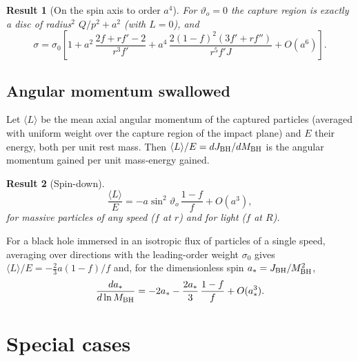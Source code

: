 \documentclass[11pt,a4paper]{article}
\newtheorem{result}{Result}
\theoremstyle{remark}
\numberwithin{equation}{section}
\begin{document}
\begin{result}[On the spin axis to order $a^4$]\label{res:pole}
For $\vartheta_o=0$ the capture region is exactly a disc of radius$^2$ $Q/p^2+a^2$ (with $L=0$), and
\begin{equation}
\sigma=\sigma_0\left[1+a^2\,\frac{2f+rf'-2}{r^3f'}+a^4\,\frac{2(1-f)^2(3f'+rf'')}{r^5f'J}+O(a^6)\right].
\label{eq:sigpole}
\end{equation}
\end{result}

\subsection{Angular momentum swallowed}
Let $\langle L\rangle$ be the mean axial angular momentum of the captured particles (averaged with
uniform weight over the capture region of the impact plane) and $E$ their energy, both per unit
rest mass. Then $\langle L\rangle/E=dJ_{\rm BH}/dM_{\rm BH}$ is the angular momentum gained per unit
mass-energy gained.
\begin{result}[Spin-down]\label{res:torque}
\begin{equation}
\frac{\langle L\rangle}{E}=-a\sin^2\vartheta_o\,\frac{1-f}{f}+O(a^3),
\label{eq:torque}
\end{equation}
for massive particles of any speed ($f$ at $r$) and for light ($f$ at $R$).
\end{result}
For a black hole immersed in an isotropic flux of particles of a single speed, averaging over
directions with the leading-order weight $\sigma_0$ gives $\langle L\rangle/E=-\tfrac23a(1-f)/f$ and,
for the dimensionless spin $a_*=J_{\rm BH}/M_{\rm BH}^2$,
\begin{equation}
\frac{da_*}{d\ln M_{\rm BH}}=-2a_*-\frac{2a_*}{3}\,\frac{1-f}{f}+O(a_*^3).
\end{equation}

\section{Special cases}\label{sec:special}
\end{document}
